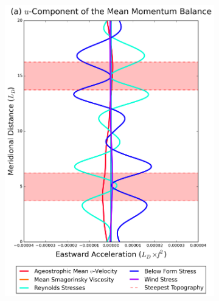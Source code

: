 \documentclass[12pt,a4paper]{report}
\begin{document}
 
 \begin{figure}
 	\centering
 	\begin{subfigure}{0.46\linewidth}
 		\centering
 		\includegraphics[width=\linewidth ]{umom_3}
 		\label{fig:umomlayer3}
 	\end{subfigure}
 	\quad
 	\begin{subfigure}{0.46\linewidth}
 		\centering

\end{subfigure}
\end{figure}
\end{document}

